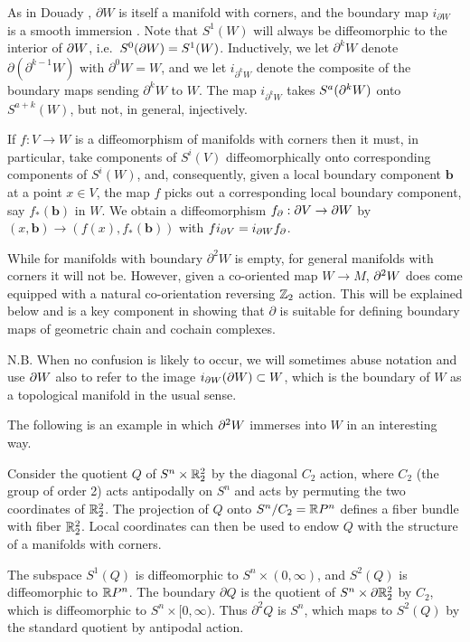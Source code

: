 As in Douady \cite{Doua61}, $\partial W$ is itself a manifold with corners, and the boundary map $i_{\partial W}$ is a smooth immersion \cite[Theorem 3.4]{Joy12}. Note that $S^1(W)$ will always be diffeomorphic to the interior of $\partial W$, i.e.\ $S^0(\partial W)=S^1(W)$.
Inductively, we let $\partial^k W$ denote $\partial (\partial^{k-1} W)$ with $\partial^0 W = W$, and we let $i_{\partial^k W}$ denote the composite of the boundary maps sending $\partial^k W$ to $W$. The map $i_{\partial^k W}$ takes $S^a(\partial^k W)$ onto $S^{a+k}(W)$, but not, in general, injectively.

\begin{remark}\label{R: bd diff}
If $f:V\to W$ is a diffeomorphism of manifolds with corners then it must, in particular, take components of $S^i(V)$ diffeomorphically onto corresponding components of $S^i(W)$, and, consequently, given a local boundary component $\mathbf{b}$ at a point $x\in V$, the map $f$ picks out a corresponding local boundary component, say $f_*(\mathbf{b})$ in $W$. We obtain a diffeomorphism $f_\partial:\partial V\to \partial W$ by $(x,\mathbf{b})\to (f(x),f_*(\mathbf{b}))$ with $fi_{\partial V}= i_{\partial W} f_\partial$.
\end{remark}

While for manifolds with boundary $\partial^2W$ is empty, for general manifolds with corners it will not be. However, given a co-oriented map $W\to M$,  $\partial^2W$ does come equipped with a natural co-orientation reversing $\mathbb{Z}_2$ action. This will be explained below and is a key component in showing that $\partial$ is suitable for defining boundary maps of geometric chain and cochain complexes.

N.B. When no confusion is likely to occur, we will sometimes abuse notation and use $\partial W$ also to refer to the image $i_{\partial W}(\partial W)\subset W$, which is the boundary of $W$ as a topological manifold in the usual sense.


The following is an example in which $\partial^2 W$ immerses into $W$ in an interesting way.

\begin{example} \label{boundary}
Consider the quotient $Q$ of $S^n \times \mathbb{R}^2_2$ by the diagonal $C_2$ action, where $C_2$ (the group of order 2) acts antipodally on $S^n$ and acts by permuting the two coordinates
of $\mathbb{R}^2_2$.
The projection of $Q$ onto $S^n / C_2 = \mathbb{R} P^n$ defines a fiber bundle with fiber $\mathbb{R}^2_2$.
Local coordinates can then be used to endow $Q$ with the structure of a  manifolds with corners.

The subspace $S^1(Q)$ is diffeomorphic to $S^n \times (0,\infty)$, and $S^2(Q)$ is diffeomorphic to $\mathbb{R} P^n$.
The boundary $\partial Q$ is the quotient of $S^n \times \partial \mathbb{R}^2_2$ by $C_2$, which is diffeomorphic to
$S^n \times [0,\infty)$.
Thus $\partial^2 Q$ is $S^n$, which maps to $S^2(Q)$ by the standard quotient by antipodal action.
\end{example}

